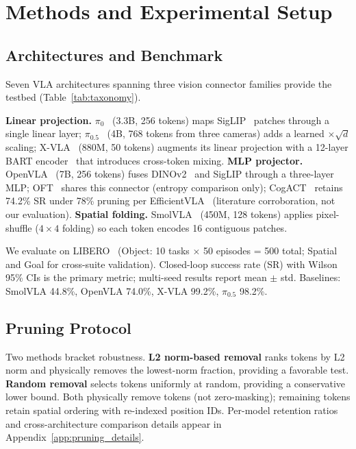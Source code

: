 \section{Methods and Experimental Setup}
\label{sec:experimental_setup}

\subsection{Architectures and Benchmark}
\label{sec:setup_overview}

Seven VLA architectures spanning three vision connector families provide the testbed (Table~\ref{tab:taxonomy}).

\textbf{Linear projection.} $\pi_0$~\cite{black2024pi0} (3.3B, 256 tokens) maps SigLIP~\cite{zhai2023siglip} patches through a single linear layer; $\pi_0.5$~\cite{black2025pi05} (4B, 768 tokens from three cameras) adds a learned $\times\!\sqrt{d}$ scaling; X-VLA~\cite{zheng2025xvla} (880M, 50 tokens) augments its linear projection with a 12-layer BART encoder~\cite{lewis2020bart} that introduces cross-token mixing. \textbf{MLP projector.} OpenVLA~\cite{kim2024openvla} (7B, 256 tokens) fuses DINOv2~\cite{oquab2023dinov2} and SigLIP through a three-layer MLP; OFT~\cite{kim2025openoft} shares this connector (entropy comparison only); CogACT~\cite{li2024cogact} retains 74.2\% SR under 78\% pruning per EfficientVLA~\cite{yang2025efficientvla} (literature corroboration, not our evaluation). \textbf{Spatial folding.} SmolVLA~\cite{shukor2025smolvla} (450M, 128 tokens) applies pixel-shuffle ($4{\times}4$ folding) so each token encodes 16 contiguous patches.

We evaluate on LIBERO~\cite{liu2023libero} (Object: 10 tasks $\times$ 50 episodes = 500 total; Spatial and Goal for cross-suite validation). Closed-loop success rate (SR) with Wilson 95\% CIs is the primary metric; multi-seed results report mean $\pm$ std. Baselines: SmolVLA 44.8\%, OpenVLA 74.0\%, X-VLA 99.2\%, $\pi_0.5$ 98.2\%.

\subsection{Pruning Protocol}
\label{sec:pruning_protocol}

Two methods bracket robustness. \textbf{L2 norm-based removal} ranks tokens by L2 norm and physically removes the lowest-norm fraction, providing a favorable test. \textbf{Random removal} selects tokens uniformly at random, providing a conservative lower bound. Both physically remove tokens (not zero-masking); remaining tokens retain spatial ordering with re-indexed position IDs. Per-model retention ratios and cross-architecture comparison details appear in Appendix~\ref{app:pruning_details}.

